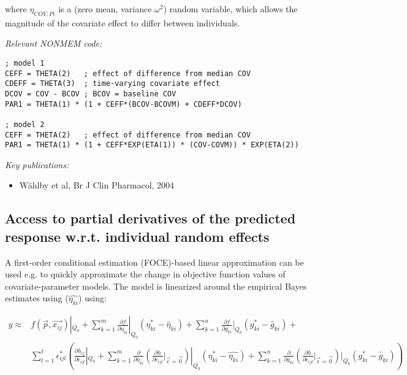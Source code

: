 \documentclass[a4paper,11pt]{article}
\begin{document}
\noindent where $\eta_{COV,Pi}$ is a (zero mean, variance $\omega^2$)
random variable, which allows the magnitude of the covariate effect to
differ between individuals.

\vspace{10pt}
\noindent \emph{Relevant NONMEM code:}
\begin{lstlisting}
; model 1
CEFF = THETA(2)   ; effect of difference from median COV
CDEFF = THETA(3)  ; time-varying covariate effect
DCOV = COV - BCOV ; BCOV = baseline COV
PAR1 = THETA(1) * (1 + CEFF*(BCOV-BCOVM) + CDEFF*DCOV)

; model 2
CEFF = THETA(2)   ; effect of difference from median COV
PAR1 = THETA(1) * (1 + CEFF*EXP(ETA(1)) * (COV-COVM)) * EXP(ETA(2))
\end{lstlisting}

\noindent \emph{Key publications:}
\begin{itemize}
\item W\"ahlby et al, Br J Clin Pharmacol, 2004
\end{itemize}

\subsection{Access to partial derivatives of the predicted response w.r.t. individual random effects}
A first-order conditional estimation (FOCE)-based linear approximation
can be used e.g. to quickly approximate the change in objective
function values of covariate-parameter models. The model is linearized
around the empirical Bayes estimates using ($\hat{\eta_{ki}}$) using:

\begin{displaymath}
\begin{split}
  y \approx & f(\vec{p},\vec{x_{ij}}) |_{Q_{0}} +
     \sum_{k=1}^{m} \frac{\partial f}{\partial \eta_{ki}} |_{Q_{0}} (\eta^*_{ki}-\hat{\eta}_{ki}) +
     \sum_{k=1}^{n} \frac{\partial f}{\partial g_{ki}} |_{Q_{0}} (g^*_{ki} - \hat{g}_{ki}) + \\
    & \sum_{l=1}^{t} \epsilon^*_{ijl} \left( \frac{\partial h_{ij}}{\partial \epsilon_{ijl}} |_{Q_0} +  \sum_{k=1}^{m} \frac{\partial}{\partial \eta_{ki}}
    \left( \frac{\partial h}{\partial \epsilon_{ijl}} |_{\vec{\epsilon}=\vec{0}} \right) |_{Q_{0}} ( \eta^*_{ki} - \hat{\eta_{ki}} ) + \sum_{k=1}^{n} \frac{\partial}{\partial g_{ki}} \left( \frac{\partial h}{\partial \epsilon_{ijl}} |_{\vec{\epsilon} = \vec{0}} \right) |_{Q_0} (g^*_{ki}-\hat{g}_{ki})  \right)
\end{split}
\end{displaymath} 
\end{document}
